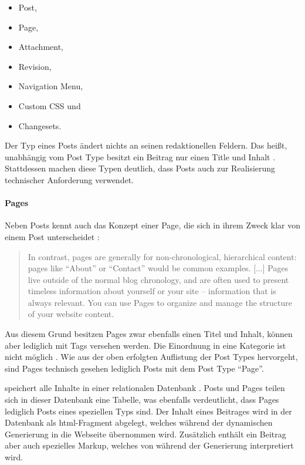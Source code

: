         \begin{itemize}
            \item Post,
            \item Page,
            \item Attachment,
            \item Revision,
            \item Navigation Menu,
            \item Custom CSS und
            \item Changesets.
        \end{itemize}

        Der Typ eines Posts ändert nichts an seinen redaktionellen Feldern.
        Das heißt, unabhängig vom Post Type besitzt ein Beitrag nur
        einen Title und Inhalt
        \cite{wordpress:Posts, wordpress:PostTypes}.
        Stattdessen machen diese Typen deutlich,
        dass {\wordpress} Posts auch zur Realisierung technischer Anforderung verwendet.

        \paragraph*{Pages}
        Neben Posts kennt {\wordpress} auch das Konzept einer Page,
        die sich in ihrem Zweck klar von einem Post unterscheidet
        \cite{wordpress:Pages}:

        \begin{quote}
            In contrast, pages are generally for non-chronological,
            hierarchical content: pages like "`About"' or "`Contact"'
            would be common examples.
            [...]
            Pages live outside of the normal blog chronology,
            and are often used to present timeless information about
            yourself or your site -- information that is always relevant.
            You can use Pages to organize and manage the structure of your website content.
        \end{quote}

        Aus diesem Grund besitzen Pages zwar ebenfalls einen Titel und Inhalt,
        können aber lediglich mit Tags versehen werden.
        Die Einordnung in eine Kategorie ist nicht möglich
        \cite{wordpress:Pages}.
        Wie aus der oben erfolgten Auflistung der Post Types hervorgeht,
        sind Pages technisch gesehen lediglich Posts mit dem Post Type "`Page"'.

        {\wordpress} speichert alle Inhalte in einer relationalen Datenbank \cite{wordpress:Database}.
        Posts und Pages teilen sich in dieser Datenbank eine Tabelle,
        was ebenfalls verdeutlicht, dass Pages lediglich Posts eines speziellen Typs sind.
        Der Inhalt eines Beitrages wird in der Datenbank als \gls{html}-Fragment abgelegt,
        welches während der dynamischen Generierung in die Webseite übernommen wird.
        Zusätzlich enthält ein Beitrag aber auch spezielles Markup,
        welches von {\wordpress} während der Generierung interpretiert wird.

